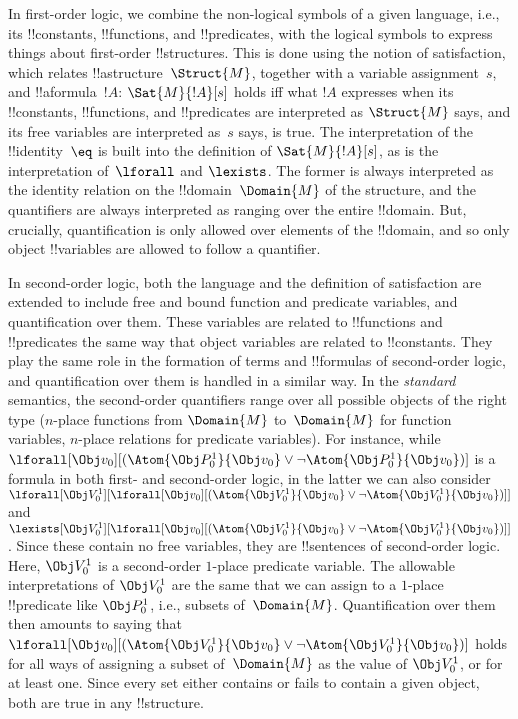 \documentclass[../../../include/open-logic-section]{subfiles}
\begin{document}

In first-order logic, we combine the non-logical symbols of a given
language, i.e., its !!{constant}s, !!{function}s, and !!{predicate}s,
with the logical symbols to express things about first-order
!!{structure}s.  This is done using the notion of satisfaction, which
relates !!a{structure}~$\Struct{M}$, together with a variable
assignment~$s$, and !!a{formula}~$!A$: $\Sat{M}{!A}[s]$ holds iff what
$!A$ expresses when its !!{constant}s, !!{function}s, and
!!{predicate}s are interpreted as $\Struct{M}$ says, and its free
variables are interpreted as~$s$ says, is true.  The interpretation of
the !!{identity}~$\eq$ is built into the definition of
$\Sat{M}{!A}[s]$, as is the interpretation of~$\lforall$ and
$\lexists$. The former is always interpreted as the identity relation
on the !!{domain}~$\Domain{M}$ of the structure, and the quantifiers
are always interpreted as ranging over the entire !!{domain}.  But,
crucially, quantification is only allowed over elements of the
!!{domain}, and so only object !!{variable}s are allowed to follow a
quantifier.

In second-order logic, both the language and the definition of
satisfaction are extended to include free and bound function and
predicate variables, and quantification over them.  These variables
are related to !!{function}s and !!{predicate}s the same way that
object variables are related to !!{constant}s.  They play the same
role in the formation of terms and !!{formula}s of second-order logic,
and quantification over them is handled in a similar way.  In the
\emph{standard} semantics, the second-order quantifiers range over all
possible objects of the right type ($n$-place functions from
$\Domain{M}$ to~$\Domain{M}$ for function variables, $n$-place
relations for predicate variables).  For instance, while
$\lforall[\Obj v_0][(\Atom{\Obj P^1_0}{\Obj v_0} \lor \lnot
  \Atom{\Obj P^1_0}{\Obj v_0})]$ is a formula in both first- and second-order
logic, in the latter we can also consider
$\lforall[\Obj V^1_0][\lforall[\Obj v_0][(\Atom{\Obj V^1_0}{\Obj v_0} \lor
  \lnot \Atom{\Obj V^1_0}{\Obj v_0})]]$ and
$\lexists[\Obj V^1_0][\lforall[\Obj v_0][(\Atom{\Obj V^1_0}{\Obj v_0} \lor
  \lnot \Atom{\Obj V^1_0}{\Obj v_0})]]$. Since these contain no free variables,
they are !!{sentence}s of second-order logic. Here, $\Obj V^1_0$ is a
second-order $1$-place predicate variable.  The allowable
interpretations of $\Obj V^1_0$ are the same that we can assign to a
$1$-place !!{predicate} like $\Obj P^1_0$, i.e., subsets
of~$\Domain{M}$.  Quantification over them then amounts to saying that
$\lforall[\Obj v_0][(\Atom{\Obj V^1_0}{\Obj v_0} \lor \lnot
\Atom{\Obj V^1_0}{\Obj v_0})]$ holds for all ways of assigning a subset
of~$\Domain{M}$ as the value of $\Obj V^1_0$, or for at least one.
Since every set either contains or fails to contain a given object,
both are true in any !!{structure}.
\end{document}
